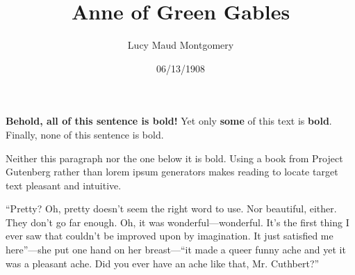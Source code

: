 \documentclass[a4paper]{article}
\title{Anne of Green Gables}
\author{Lucy Maud Montgomery}
\date{06/13/1908}
\begin{document}
\maketitle

\textbf{Behold, all of this sentence is bold!} Yet only \textbf{some} of this text is \textbf{bold}. Finally, none of this sentence is bold.

Neither this paragraph nor the one below it is bold. Using a book from Project Gutenberg rather than lorem ipsum generators makes reading to locate target text pleasant and intuitive.

``Pretty? Oh, pretty doesn't seem the right word to use. Nor beautiful, either. They don't go far enough. Oh, it was wonderful---wonderful. It's the first thing I ever saw that couldn't be improved upon by imagination. It just satisfied me here''---she put one hand on her breast---``it made a queer funny ache and yet it was a pleasant ache. Did you ever have an ache like that, Mr. Cuthbert?''
\end{document}
